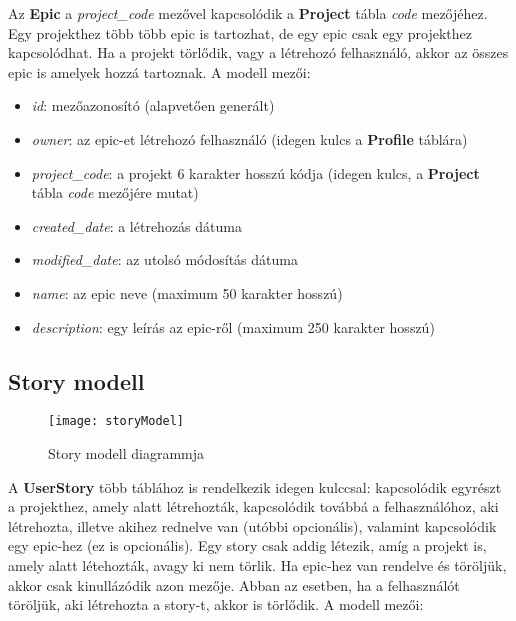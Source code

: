 Az \textbf{Epic} a \textit{project\_code} mezővel kapcsolódik a \textbf{Project} tábla \textit{code} mezőjéhez. Egy projekthez több több epic is tartozhat, de egy epic csak egy projekthez kapcsolódhat. Ha a projekt törlődik, vagy a létrehozó felhasználó, akkor az összes epic is amelyek hozzá tartoznak. A modell mezői:

\begin{itemize}
	\item \textit{id}: mezőazonosító (alapvetően generált)
	\item \textit{owner}: az epic-et létrehozó felhasználó (idegen kulcs a \textbf{Profile} táblára)
	\item \textit{project\_code}: a projekt 6 karakter hosszú kódja (idegen kulcs, a \textbf{Project} tábla \textit{code} mezőjére mutat)
	\item \textit{created\_date}: a létrehozás dátuma
	\item \textit{modified\_date}: az utolsó módosítás dátuma
	\item \textit{name}: az epic neve (maximum 50 karakter hosszú)
	\item \textit{description}: egy leírás az epic-ről (maximum 250 karakter hosszú)
\end{itemize}

\subsection{Story modell}

\begin{figure}[H]
	\centering
	\texttt{[image: storyModel]}
	\caption{Story modell diagrammja}
	\label{fig:storymodel}
\end{figure}

A \textbf{UserStory} több táblához is rendelkezik idegen kulccsal: kapcsolódik egyrészt a projekthez, amely alatt létrehozták, kapcsolódik továbbá a felhasználóhoz, aki létrehozta, illetve akihez rednelve van (utóbbi opcionális), valamint kapcsolódik egy epic-hez (ez is opcionális). Egy story csak addig létezik, amíg a projekt is, amely alatt létehozták, avagy ki nem törlik. Ha epic-hez van rendelve és töröljük, akkor csak kinullázódik azon mezője. Abban az esetben, ha a felhasználót töröljük, aki létrehozta a story-t, akkor is törlődik. A modell mezői:

